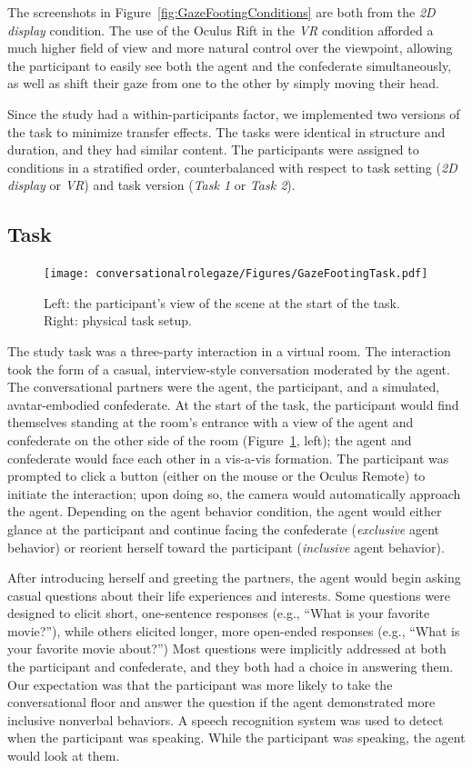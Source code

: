 The screenshots in Figure~\ref{fig:GazeFootingConditions} are both from the \emph{2D display} condition. The use of the Oculus Rift in the \emph{VR} condition afforded a much higher field of view and more natural control over the viewpoint, allowing the participant to easily see both the agent and the confederate simultaneously, as well as shift their gaze from one to the other by simply moving their head.

Since the study had a within-participants factor, we implemented two versions of the task to minimize transfer effects. The tasks were identical in structure and duration, and they had similar content. The participants were assigned to conditions in a stratified order, counterbalanced with respect to task setting (\emph{2D display} or \emph{VR}) and task version (\emph{Task 1} or \emph{Task 2}).

\subsection{Task}

\begin{figure}
\centering
\texttt{[image: conversationalrolegaze/Figures/GazeFootingTask.pdf]}
\caption{Left: the participant's view of the scene at the start of the task. Right: physical task setup.}
\label{fig:GazeFootingTask}
\end{figure}

The study task was a three-party interaction in a virtual room. The interaction took the form of a casual, interview-style conversation moderated by the agent. The conversational partners were the agent, the participant, and a simulated, avatar-embodied confederate. At the start of the task, the participant would find themselves standing at the room's entrance with a view of the agent and confederate on the other side of the room (Figure~\ref{fig:GazeFootingTask}, left); the agent and confederate would face each other in a vis-a-vis formation. The participant was prompted to click a button (either on the mouse or the Oculus Remote) to initiate the interaction; upon doing so, the camera would automatically approach the agent. Depending on the agent behavior condition, the agent would either glance at the participant and continue facing the confederate (\emph{exclusive} agent behavior) or reorient herself toward the participant (\emph{inclusive} agent behavior).

After introducing herself and greeting the partners, the agent would begin asking casual questions about their life experiences and interests. Some questions were designed to elicit short, one-sentence responses (e.g., ``What is your favorite movie?''), while others elicited longer, more open-ended responses (e.g., ``What is your favorite movie about?'') Most questions were implicitly addressed at both the participant and confederate, and they both had a choice in answering them. Our expectation was that the participant was more likely to take the conversational floor and answer the question if the agent demonstrated more inclusive nonverbal behaviors. A speech recognition system was used to detect when the participant was speaking. While the participant was speaking, the agent would look at them.

